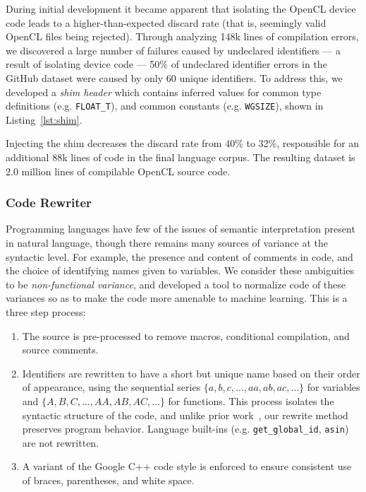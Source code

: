 During initial development it became apparent that isolating the OpenCL device code leads to a higher-than-expected discard rate (that is, seemingly valid OpenCL files being rejected). Through analyzing 148k lines of compilation errors, we discovered a large number of failures caused by undeclared identifiers --- a result of isolating device code --- 50\% of undeclared identifier errors in the GitHub dataset were caused by only 60 unique identifiers. To address this, we developed a \emph{shim header} which contains inferred values for common type definitions (e.g. \texttt{FLOAT\_T}), and common constants (e.g. \texttt{WGSIZE}), shown in Listing~\ref{lst:shim}.

Injecting the shim decreases the discard rate from 40\% to 32\%, responsible for an additional 88k lines of code in the final language corpus. The resulting dataset is 2.0 million lines of compilable OpenCL source code.

\subsubsection{Code Rewriter} Programming languages have few of the issues of semantic interpretation present in natural language, though there remains many sources of variance at the syntactic level. For example, the presence and content of comments in code, and the choice of identifying names given to variables. We consider these  ambiguities to be \emph{non-functional variance}, and developed a tool to normalize code of these variances so as to make the code more amenable to machine learning. This is a three step process: %
%
\begin{enumerate}
  \item The source is pre-processed to remove macros, conditional compilation, and source comments. %
  \item Identifiers are rewritten to have a short but unique name based on their order of appearance, using the sequential series $\{a,\allowbreak b,\allowbreak c,\allowbreak \ldots,\allowbreak aa,\allowbreak ab,\allowbreak ac,\allowbreak \ldots\}$ for variables and $\{A,\allowbreak B,\allowbreak C,\allowbreak \ldots,\allowbreak AA,\allowbreak AB,\allowbreak AC,\allowbreak \ldots\}$ for functions. This process isolates the syntactic structure of the code, and unlike prior work~\cite{Allamanis2013a}, our rewrite method preserves program behavior. Language built-ins (e.g. \texttt{get\_global\_id}, \texttt{asin}) are not rewritten.%
  \item A variant of the Google C++ code style is enforced to ensure consistent use of braces, parentheses, and white space.
\end{enumerate}



